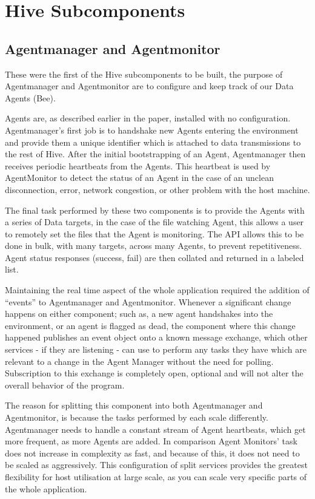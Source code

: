 \section{Hive Subcomponents}

\subsection{Agentmanager and Agentmonitor}

These were the first of the Hive subcomponents to be built, the purpose of
Agentmanager and Agentmonitor are to configure and keep track of our Data Agents
(Bee).

Agents are, as described earlier in the paper, installed with no configuration.
Agentmanager’s first job is to handshake new Agents entering the environment and
provide them a unique identifier which is attached to data transmissions to the
rest of Hive. After the initial bootstrapping of an Agent, Agentmanager then
receives periodic heartbeats from the Agents. This heartbeat is used by
AgentMonitor to detect the status of an Agent in the case of an unclean
disconnection, error, network congestion, or other problem with the host
machine.

The final task performed by these two components is to provide the Agents with a
series of Data targets, in the case of the file watching Agent, this allows a
user to remotely set the files that the Agent is monitoring. The API allows this
to be done in bulk, with many targets, across many Agents, to prevent
repetitiveness. Agent status responses (success, fail) are then collated and
returned in a labeled list.

Maintaining the real time aspect of the whole application required the addition
of “events” to Agentmanager and Agentmonitor. Whenever a significant change
happens on either component; such as, a new agent handshakes into the
environment, or an agent is flagged as dead, the component where this change
happened publishes an event object onto a known message exchange, which other
services - if they are listening - can use to perform any tasks they have which
are relevant to a change in the Agent Manager without the need for polling.
Subscription to this exchange is completely open, optional and will not alter
the overall behavior of the program.

The reason for splitting this component into both Agentmanager and Agentmonitor,
is because the tasks performed by each scale differently. Agentmanager needs to
handle a constant stream of Agent heartbeats, which get more frequent, as more
Agents are added. In comparison Agent Monitors’ task does not increase in
complexity as fast, and because of this, it does not need to be scaled as
aggressively. This configuration of split services provides the greatest
flexibility for host utilisation at large scale, as you can scale very specific
parts of the whole application.

